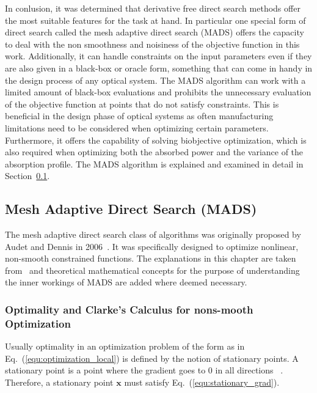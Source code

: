 \documentclass[a4paper,10pt]{article}
\renewcommand{\vec}[1]{\mathbf{#1}}
\newcommand{\equref}[1]{Eq.~(\ref{#1})}
\newcommand{\secref}[1]{Section~\ref{#1}}
\begin{document}
    In conlusion, it was determined that derivative free direct search
    methods offer the most suitable features for the task at hand.
    In particular one special form of direct search called the
    mesh adaptive direct search (MADS) offers the capacity to
    deal with the non smoothness and noisiness of the objective
    function in this work.
    Additionally, it can handle constraints on the input parameters
    even if they are also given in a black-box or oracle form,
    something that can come in handy in the design process of 
    any optical system.
    The MADS algorithm can work with a limited amount of black-box
    evaluations and prohibits the unnecessary evaluation of
    the objective function at points that do not satisfy constraints.
    This is beneficial in the design phase of optical systems as
    often manufacturing limitations need to be considered when
    optimizing certain parameters. 
    Furthermore, it offers the capability of solving biobjective
    optimization, which is also required when optimizing both
    the absorbed power and the variance of the absorption profile.
    The MADS algorithm is explained and examined in detail in 
    \secref{sec:mads}.
    
    \subsection{Mesh Adaptive Direct Search (MADS)} \label{sec:mads}

    The mesh adaptive direct search class of algorithms was originally
    proposed by Audet and Dennis in 2006~\cite{mads_original}.
    It was specifically designed to optimize nonlinear, non-smooth
    constrained functions.
    The explanations in this chapter are taken from~\cite{mads_original}
    and theoretical mathematical concepts for the purpose of understanding
    the inner workings of MADS are added where deemed necessary.

    \subsubsection{Optimality and Clarke's Calculus for nons-mooth Optimization} 
    \label{sec:optimality}

    Usually optimality in an optimization problem of the form as in
    \equref{equ:optimization_local} is defined by the notion of stationary
    points.
    A stationary point is a point where the gradient goes to 0 in all
    directions ~\cite{solomon_numerical}.
    Therefore, a stationary point $\vec{x}$ must satisfy \equref{equ:stationary_grad}.
\end{document}
